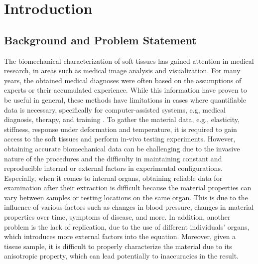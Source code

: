 
\chapter{Introduction} %

\label{Chapter2} %

\section{Background and Problem Statement}
The biomechanical characterization of soft tissues has gained attention
in medical research, in areas such as medical image analysis and visualization.
For many years, the obtained medical diagnoses were often based on the assumptions of experts or 
their accumulated experience. While this information have proven to be useful in general, 
these methods have limitations in cases where quantifiable data is necessary, specifically for computer-assisted systems, e.g,
medical diagnosis, therapy, and training \cite{Kauer2002}.
To gather the material data, e.g., elasticity, stiffness, response under deformation and temperature, it is required 
to gain access to the soft tissues and perform in-vivo testing experiments. 
However, obtaining accurate biomechanical data can be challenging
due to the invasive nature of the procedures and the difficulty in maintaining constant and reproducible internal or external factors  
in experimental configurations.\\

Especially, when it comes to internal organs, obtaining reliable data for examination after their 
extraction is difficult because the material properties can vary between samples or testing 
locations on the same organ. This is due to the influence of various factors such as changes in blood pressure, changes in material properties 
over time, symptoms of disease, and more. In addition, another problem is the lack 
of replication, due to the use of different individuals' organs, which introduces more external
factors into the equation. Moreover, given a tissue sample, it is difficult to properly 
characterize the material due to its anisotropic property, which can lead potentially
 to inaccuracies in the result.

